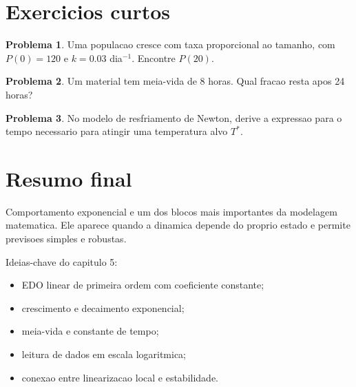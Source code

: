 \documentclass[12pt,a4paper,oneside]{book}
\theoremstyle{definition}
\newtheorem{problem}{Problema}
\begin{document}
\section{Exercicios curtos}

\begin{problem}
Uma populacao cresce com taxa proporcional ao tamanho, com $P(0)=120$ e $k=0.03$ dia$^{-1}$. Encontre $P(20)$.
\end{problem}

\begin{problem}
Um material tem meia-vida de 8 horas. Qual fracao resta apos 24 horas?
\end{problem}

\begin{problem}
No modelo de resfriamento de Newton, derive a expressao para o tempo necessario para atingir uma temperatura alvo $T^*$.
\end{problem}

\section{Resumo final}

Comportamento exponencial e um dos blocos mais importantes da modelagem matematica.
Ele aparece quando a dinamica depende do proprio estado e permite previsoes simples e robustas.

Ideias-chave do capitulo 5:
\begin{itemize}
    \item EDO linear de primeira ordem com coeficiente constante;
    \item crescimento e decaimento exponencial;
    \item meia-vida e constante de tempo;
    \item leitura de dados em escala logaritmica;
    \item conexao entre linearizacao local e estabilidade.
\end{itemize}
\end{document}
